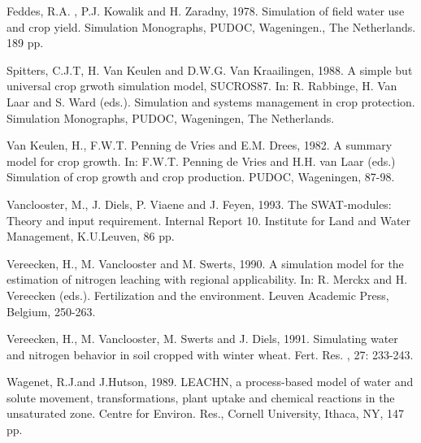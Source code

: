 Feddes, R.A. , P.J. Kowalik and H. Zaradny, 1978. Simulation of field water use and crop yield. Simulation Monographs, PUDOC, Wageningen., The Netherlands. 189 pp.

Spitters, C.J.T, H. Van Keulen and D.W.G. Van Kraailingen, 1988. A simple but universal crop grwoth simulation model, SUCROS87. In: R. Rabbinge, H. Van Laar and S. Ward (eds.). Simulation and systems management in crop protection. Simulation Monographs, PUDOC, Wageningen, The Netherlands.

Van Keulen, H., F.W.T. Penning de Vries and E.M. Drees, 1982. A summary model for crop growth. In: F.W.T. Penning de Vries and H.H. van Laar (eds.) Simulation of crop growth and crop production. PUDOC, Wageningen, 87-98.

Vanclooster, M., J. Diels, P. Viaene and J. Feyen, 1993. The SWAT-modules: Theory and input requirement. Internal Report 10. Institute for Land and Water Management, K.U.Leuven, 86 pp.

Vereecken, H., M. Vanclooster and M. Swerts, 1990. A simulation model for the estimation of nitrogen leaching with regional applicability. In: R. Merckx and H. Vereecken (eds.). Fertilization and the environment. Leuven Academic Press, Belgium, 250-263.

Vereecken, H., M. Vanclooster, M. Swerts and J. Diels, 1991. Simulating water and nitrogen behavior in soil cropped with winter wheat. Fert. Res. , 27: 233-243.

Wagenet, R.J.and J.Hutson, 1989. LEACHN, a process-based model of water and solute movement, transformations, plant uptake and chemical reactions in the unsaturated zone. Centre for Environ. Res., Cornell University, Ithaca, NY, 147 pp.
